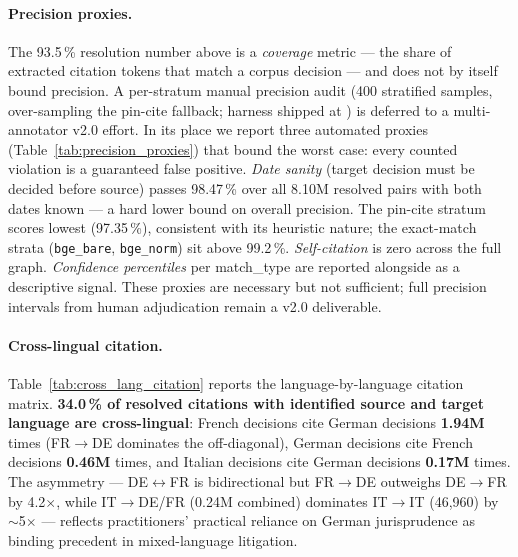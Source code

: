 \documentclass[11pt,a4paper]{article}
\begin{document}
\paragraph{Precision proxies.} The 93.5\,\% resolution number above is a \emph{coverage} metric --- the share of extracted citation tokens that match a corpus decision --- and does not by itself bound precision. A per-stratum manual precision audit (400 stratified samples, over-sampling the pin-cite fallback; harness shipped at ) is deferred to a multi-annotator v2.0 effort. In its place we report three automated proxies (Table~\ref{tab:precision_proxies}) that bound the worst case: every counted violation is a guaranteed false positive. \emph{Date sanity} (target decision must be decided before source) passes 98.47\,\% over all 8.10M resolved pairs with both dates known --- a hard lower bound on overall precision. The pin-cite stratum scores lowest (97.35\,\%), consistent with its heuristic nature; the exact-match strata (\texttt{bge\_bare}, \texttt{bge\_norm}) sit above 99.2\,\%. \emph{Self-citation} is zero across the full graph. \emph{Confidence percentiles} per match\_type are reported alongside as a descriptive signal. These proxies are necessary but not sufficient; full precision intervals from human adjudication remain a v2.0 deliverable.



\paragraph{Cross-lingual citation.} Table~\ref{tab:cross_lang_citation} reports the language-by-language citation matrix. \textbf{34.0\,\% of resolved citations with identified source and target language are cross-lingual}: French decisions cite German decisions \textbf{1.94M} times (FR$\to$DE dominates the off-diagonal), German decisions cite French decisions \textbf{0.46M} times, and Italian decisions cite German decisions \textbf{0.17M} times. The asymmetry --- DE$\leftrightarrow$FR is bidirectional but FR$\to$DE outweighs DE$\to$FR by 4.2$\times$, while IT$\to$DE/FR (0.24M combined) dominates IT$\to$IT (46{,}960) by $\sim$5$\times$ --- reflects practitioners' practical reliance on German jurisprudence as binding precedent in mixed-language litigation.
\end{document}
